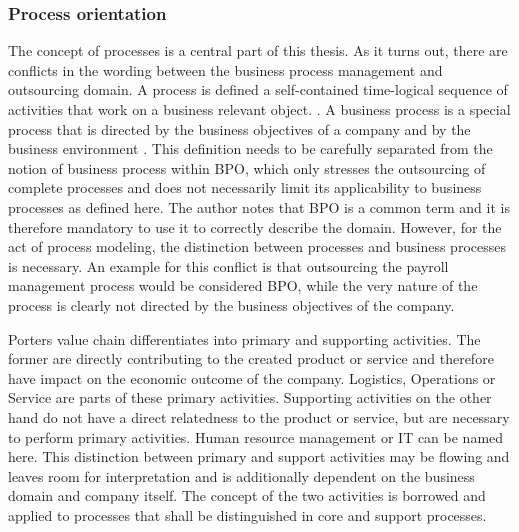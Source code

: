 		\subsubsection{Process orientation}
		
	The concept of processes is a central part of this thesis. As it turns out, there are conflicts in the wording between the business process management and outsourcing domain. A process is defined a self-contained time-logical sequence of activities that work on a business relevant object. \citep[]{becker2012pm}. A business process is a special process that is directed by the business objectives of a company and by the business environment \citep[]{becker2012pm}. This definition needs to be carefully separated from the notion of business process within BPO, which only stresses the outsourcing of complete processes and does not necessarily limit its applicability to business processes as defined here. The author notes that BPO is a common term and it is therefore mandatory to use it to correctly describe the domain. However, for the act of process modeling, the distinction between processes and business processes is necessary. An example for this conflict is that outsourcing the payroll management process would be considered BPO, while the very nature of the process is clearly not directed by the business objectives of the company. 
	
	Porters value chain differentiates into primary and supporting activities. The former are directly contributing to the created product or service and therefore have impact on the economic outcome of the company. Logistics, Operations or Service are parts of these primary activities. Supporting activities on the other hand do not have a direct relatedness to the product or service, but are necessary to perform primary activities. Human resource management or IT can be named here. This distinction between primary and support activities may be flowing and leaves room for interpretation and is additionally dependent on the business domain and company itself. The concept of the two activities is borrowed and applied to processes that shall be distinguished in core and support processes. 
	 
